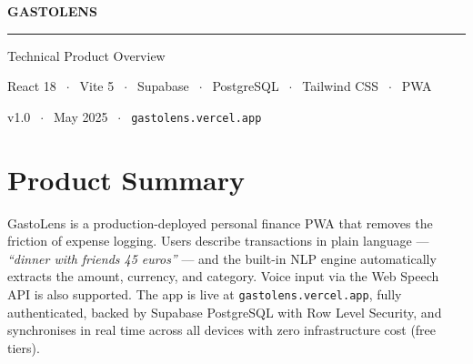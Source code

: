\documentclass[a4paper,10pt]{article}
\begin{document}
\thispagestyle{empty}
\vspace*{\fill}

\begin{center}

  {\fontsize{84}{84}\selectfont\color{ngreen}\faWallet}

  \vspace{1.4cm}

  {\fontsize{46}{46}\selectfont\bfseries\color{tw} GASTOLENS}

  \vspace{0.5cm}
  {\color{bdr2}\rule{10cm}{0.4pt}}
  \vspace{0.5cm}

  {\large\color{tm} Technical Product Overview}

  \vspace{3cm}

  {\small\color{tm}
    React 18 $\;\cdot\;$ Vite 5 $\;\cdot\;$ Supabase
    $\;\cdot\;$ PostgreSQL $\;\cdot\;$ Tailwind CSS $\;\cdot\;$ PWA
  }

  \vspace{0.7cm}

  {\footnotesize\color{td}
    v1.0 $\;\cdot\;$ May 2025
    $\;\cdot\;$ {\color{ncyan}\texttt{gastolens.vercel.app}}
  }

\end{center}

\vspace*{\fill}
\newpage

\thispagestyle{empty}

\section{Product Summary}

{\small
GastoLens is a production-deployed personal finance PWA that removes the
friction of expense logging. Users describe transactions in plain language ---
\textit{``dinner with friends 45 euros''} --- and the built-in NLP engine
automatically extracts the amount, currency, and category. Voice input via
the Web Speech API is also supported. The app is live at
{\color{ncyan}\texttt{gastolens.vercel.app}}, fully authenticated, backed
by Supabase PostgreSQL with Row Level Security, and synchronises in real
time across all devices with zero infrastructure cost (free tiers).
}
\end{document}
